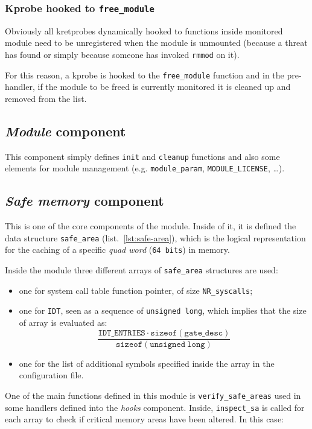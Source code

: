 \documentclass{article}
\begin{document}
	\subsubsection{Kprobe hooked to \texttt{free\_module}}
	Obviously all kretprobes dynamically hooked to functions inside monitored module need to be unregistered when the
	module is unmounted (because a threat has found or simply because someone has invoked \texttt{rmmod} on it).

	For this reason, a kprobe is hooked to the \texttt{free\_module} function and in the pre-handler, if the
	module to be freed is currently monitored it is cleaned up and removed from the list.

	\subsection{\emph{Module} component}\label{sec:module}
	This component simply defines \texttt{init} and \texttt{cleanup} functions and also some elements for module
	management (e.g. \texttt{module\_param}, \texttt{MODULE\_LICENSE}, \dots).

	\subsection{\emph{Safe memory} component}\label{sec:safemem}
	This is one of the core components of the module. Inside of it, it is defined the data structure
	\texttt{safe\_area} (list.~\ref{lst:safe-area}), which is the logical representation for the caching of	a specific
	\textit{quad word} (\texttt{64 bits}) in memory.

	Inside the module three different arrays of \texttt{safe\_area} structures are used:
	\begin{itemize}
		\item one for system call table function pointer, of size \texttt{NR\_syscalls};
		\item one for \texttt{IDT}, seen as a sequence of \texttt{unsigned long}, which implies that the size of array
		is evaluated as:
		\begin{equation*}
			\dfrac{\mathtt{IDT\_ENTRIES} \cdot \mathtt{sizeof(gate\_desc)}}{\mathtt{sizeof(unsigned\ long)}}
		\end{equation*}
		\item one for the list of additional symbols specified inside the array in the configuration file.
	\end{itemize}

	One of the main functions defined in this module is \texttt{verify\_safe\_areas} used in some handlers defined
	into the \emph{hooks} component. Inside, \texttt{inspect\_sa} is called for each array to check if
	critical memory areas have been altered. In this case:
\end{document}
